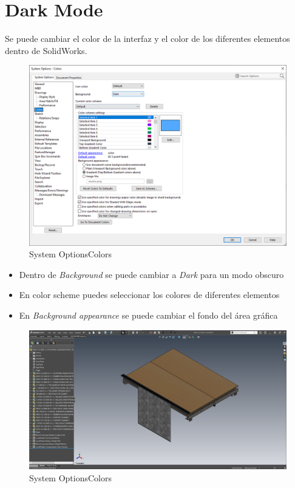 \documentclass{report}
\begin{document}
\chapter{Dark Mode}

Se puede cambiar el color de la interfaz y el color de los diferentes elementos dentro de SolidWorks.

\begin{figure}[H]
	\centering
	\includegraphics[width=0.95\linewidth, height=0.65\textheight,keepaspectratio]{Imagenes/solidworks_dark_mode01}
	\caption{System Options\textrightarrow Colors}
	\label{fig:solidworksdarkmode01}
\end{figure}

\begin{itemize}
	\item Dentro de \emph{Background} se puede cambiar a \emph{Dark} para un modo obscuro
	\item En color scheme puedes seleccionar los colores de diferentes elementos
	\item En \emph{Background appearance} se puede cambiar el fondo del área gráfica
\end{itemize}

\begin{figure}[H]
	\centering
	\includegraphics[width=0.95\linewidth, height=0.75\textheight,keepaspectratio]{Imagenes/solidworks_dark_mode02}
	\caption{System Options\textrightarrow Colors}
	\label{fig:solidworksdarkmode02}
\end{figure}
\end{document}
